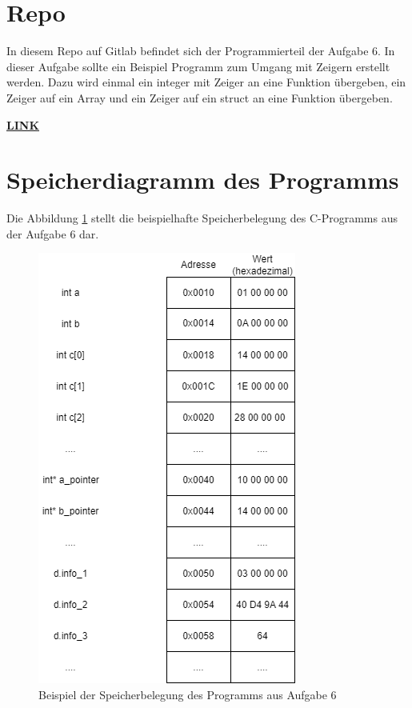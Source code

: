 \section{Repo}
In diesem Repo auf Gitlab befindet sich der Programmierteil der Aufgabe 6. In dieser Aufgabe sollte ein Beispiel Programm zum Umgang mit Zeigern erstellt werden. Dazu wird einmal ein integer mit Zeiger an eine Funktion übergeben, ein Zeiger auf ein Array und ein Zeiger auf ein struct an eine Funktion übergeben.\par
\href{https://gitlab.thga.de/daniel.krueger/pruefung_sose_2023_aufgabe_6_pointer}{\textbf{LINK}}

\section{Speicherdiagramm des Programms}
Die Abbildung \ref{speicherdiagramm} stellt die beispielhafte Speicherbelegung des C-Programms aus der Aufgabe 6 dar.\par

\begin{figure}[h]
	\centering
	\includegraphics[scale=0.5]{Images/speicherdiagramm_aufgabe6.png}
	\caption{Beispiel der Speicherbelegung des Programms aus Aufgabe 6}
	\label{speicherdiagramm}
\end{figure}
